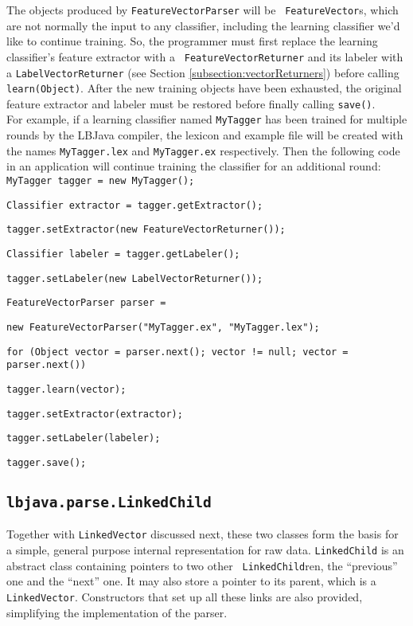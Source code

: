 The objects produced by {\tt FeatureVectorParser} will be {\tt
FeatureVector}s, which are not normally the input to any classifier, including
the learning classifier we'd like to continue training.  So, the programmer
must first replace the learning classifier's feature extractor with a {\tt
FeatureVectorReturner} and its labeler with a {\tt LabelVectorReturner} (see
Section \ref{subsection:vectorReturners}) before calling {\tt learn(Object)}.
After the new training objects have been exhausted, the original feature
extractor and labeler must be restored before finally calling {\tt save()}. \\

For example, if a learning classifier named {\tt MyTagger} has been trained
for multiple rounds by the LBJava compiler, the lexicon and example file will be
created with the names {\tt MyTagger.lex} and {\tt MyTagger.ex} respectively.
Then the following code in an application will continue training the
classifier for an additional round: \\

\vspace{-.25cm}
{\tt MyTagger tagger = new MyTagger();}

{\tt Classifier extractor = tagger.getExtractor();}

{\tt tagger.setExtractor(new FeatureVectorReturner());}

{\tt Classifier labeler = tagger.getLabeler();}

{\tt tagger.setLabeler(new LabelVectorReturner());}

{\tt FeatureVectorParser parser =}

\hspace{.4cm} {\tt new FeatureVectorParser("MyTagger.ex", "MyTagger.lex");}

{\tt for (Object vector = parser.next(); vector != null;
          vector = parser.next())}

\hspace{.4cm} {\tt tagger.learn(vector);}

{\tt tagger.setExtractor(extractor);}

{\tt tagger.setLabeler(labeler);}

{\tt tagger.save();}

\subsection{{\tt lbjava.parse.LinkedChild}} \label{subsection:linkedChild}
Together with {\tt LinkedVector} discussed next, these two classes form the
basis for a simple, general purpose internal representation for raw data.
{\tt LinkedChild} is an abstract class containing pointers to two other {\tt
LinkedChild}ren, the ``previous'' one and the ``next'' one.  It may also store
a pointer to its parent, which is a {\tt LinkedVector}.  Constructors that set
up all these links are also provided, simplifying the implementation of the
parser.

